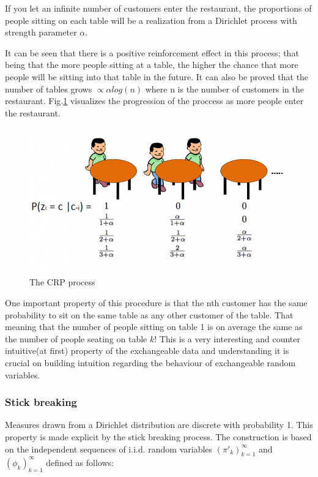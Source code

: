 \documentclass[twoside,hidelinks]{article}
\begin{document}
If you let an infinite number of customers enter the restaurant, the proportions of people sitting on each table will be a realization from a Dirichlet process with strength parameter $\alpha$.

It can be seen that there is a positive reinforcement effect in this process; that being that the more people sitting at a table, the higher the chance that more people will be sitting into that table in the future. It can also be proved that the number of tables grows $ \propto \alpha log(n)$ where n is the number of customers in the restaurant. Fig.\ref{CRP} visualizes the progression of the proccess as more people enter the restaurant. 

\begin{figure}[!h]
          \centerline{\includegraphics[width=.70\textwidth]{crp}}
	\caption{The CRP process}
	\label{CRP}
\end{figure}


One important property of this procedure is that the nth customer has the same probability to sit on the same table as any other customer of the table. That meaning that the number of people sitting on table 1 is on average the same as the number of people seating on table $k$! This is a very interesting and counter intuitive(at first) property of the exchangeable data and understanding it is crucial on building intuition regarding the behaviour of exchangeable random variables.

\subsubsection{Stick breaking}

Measures drawn from a Dirichlet distribution are discrete with probability 1. This property is made explicit by the stick breaking process. The construction is based on the independent sequences of i.i.d. random variables $(\pi'_k)_{k=1}^\infty$ and $ ( \phi_k)_{k=1}^\infty$  defined as follows:
\end{document}
